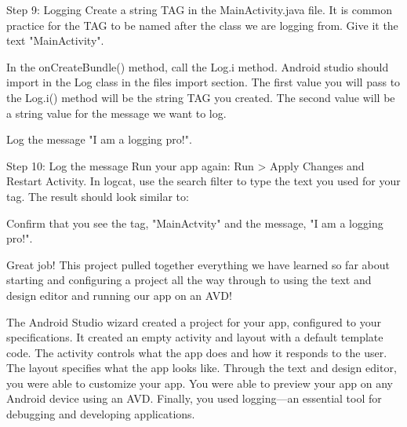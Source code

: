     Step 9: Logging
        Create a string TAG in the MainActivity.java file. It is common practice for the TAG to be named after the class we are logging from. Give it the text "MainActivity".

        In the onCreateBundle() method, call the Log.i method. Android studio should import in the Log class in the files import section. The first value you will pass to the Log.i() method will be the string TAG you created. The second value will be a string value for the message we want to log.

        Log the message "I am a logging pro!".

    Step 10: Log the message
        Run your app again: Run > Apply Changes and Restart Activity. In logcat, use the search filter to type the text you used for your tag. The result should look similar to:

        Confirm that you see the tag, "MainActvity" and the message, "I am a logging pro!".

Great job!
        This project pulled together everything we have learned so far about starting and configuring a project all the way through to using the text and design editor and running our app on an AVD!

        The Android Studio wizard created a project for your app, configured to your specifications. It created an empty activity and layout with a default template code. The activity controls what the app does and how it responds to the user. The layout specifies what the app looks like. Through the text and design editor, you were able to customize your app. You were able to preview your app on any Android device using an AVD. Finally, you used logging—an essential tool for debugging and developing applications.